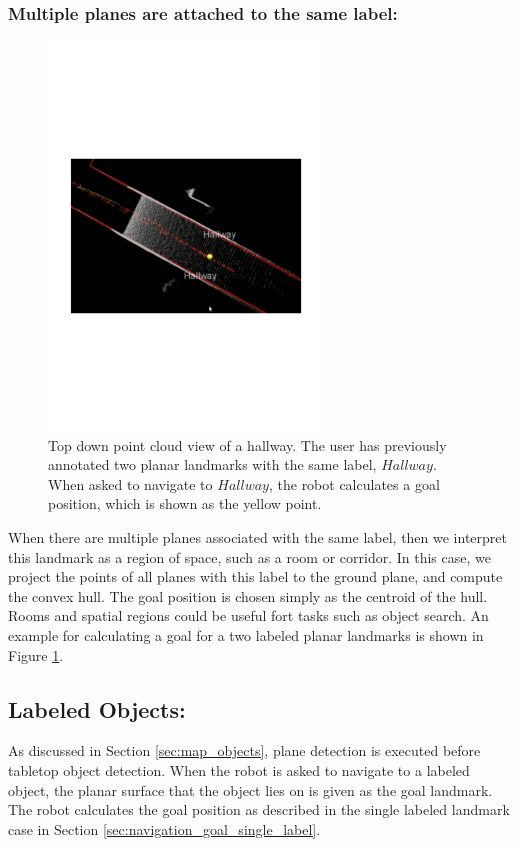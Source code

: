 \subsubsection{Multiple planes are attached to the same label: }

\begin{figure}[ht!]
\centering
\includegraphics[width=0.65\textwidth]{pics/double_plane}
\caption{Top down point cloud view of a hallway. The user has previously annotated two planar landmarks with the same label, $Hallway$. When asked to navigate to $Hallway$, the robot calculates a goal position, which is shown as the yellow point.}
\label{fig:double_plane}
\end{figure}

When there are multiple planes associated with the same label, then we interpret this landmark as a region of space, such as a room or corridor. In this case, we project the points of all planes with this label to the ground plane, and compute the convex hull. The goal position is chosen simply as the centroid of the hull. Rooms and spatial regions could be useful fort tasks such as object search. An example for calculating a goal for a two labeled planar landmarks is shown in Figure \ref{fig:double_plane}. 

\subsection{Labeled Objects:} As discussed in Section \ref{sec:map_objects}, plane detection is executed before tabletop object detection. When the robot is asked to navigate to a labeled object, the planar surface that the object lies on is given as the goal landmark. The robot calculates the goal position as described in the single labeled landmark case in Section \ref{sec:navigation_goal_single_label}.

